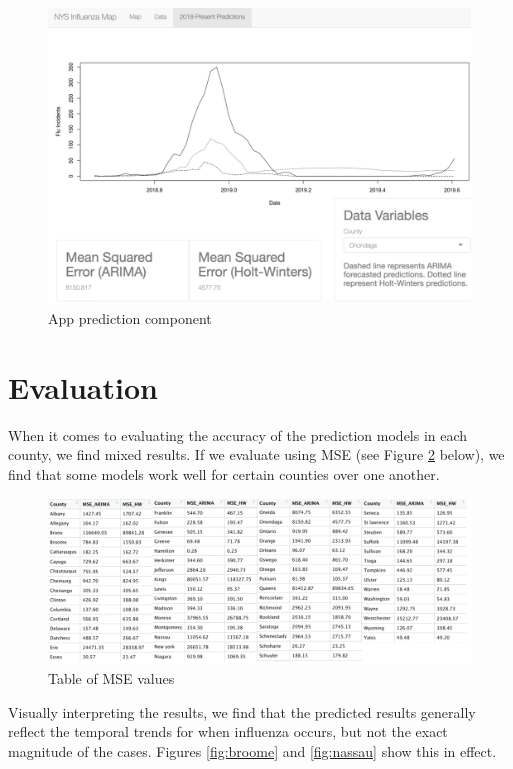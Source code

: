 \documentclass[12pt]{article}
\begin{document}
\begin{figure}[H]
\centering
\includegraphics{Picture3.png}
\caption{App prediction component}
\label{fig:prediction}
\end{figure}

\section{Evaluation}

When it comes to evaluating the accuracy of the prediction models in each county, we find mixed results. If we evaluate using MSE (see Figure \ref{fig:mse} below), we find that some models work well for certain counties over one another.

\begin{figure}[H]
\centering
\includegraphics{Picture4.png}
\caption{Table of MSE values}
\label{fig:mse}
\end{figure}

Visually interpreting the results, we find that the predicted results generally reflect the temporal trends for when influenza occurs, but not the exact magnitude of the cases. Figures \ref{fig:broome} and \ref{fig:nassau} show this in effect.
\end{document}
